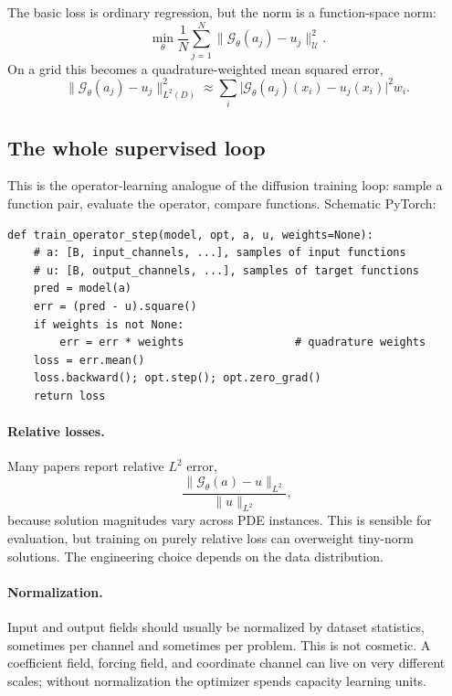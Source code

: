 \documentclass[10pt,a4paper]{article}
\newcommand{\G}{\mathcal{G}}
\newcommand{\U}{\mathcal{U}}
\begin{document}
The basic loss is ordinary regression, but the norm is a function-space norm:
\begin{equation}
  \min_\theta
  \frac1N \sum_{j=1}^N
  \big\| \G_\theta(a_j) - u_j \big\|_{\U}^2.
\label{eq:operator-loss}
\end{equation}
On a grid this becomes a quadrature-weighted mean squared error,
\begin{equation}
  \big\| \G_\theta(a_j) - u_j \big\|_{L^2(D)}^2
  \approx
  \sum_i
  \big|\G_\theta(a_j)(x_i)-u_j(x_i)\big|^2 w_i.
\label{eq:grid-loss}
\end{equation}

\subsection{The whole supervised loop}

This is the operator-learning analogue of the diffusion training loop:
sample a function pair, evaluate the operator, compare functions. Schematic
PyTorch:
\begin{lstlisting}
def train_operator_step(model, opt, a, u, weights=None):
    # a: [B, input_channels, ...], samples of input functions
    # u: [B, output_channels, ...], samples of target functions
    pred = model(a)
    err = (pred - u).square()
    if weights is not None:
        err = err * weights                 # quadrature weights
    loss = err.mean()
    loss.backward(); opt.step(); opt.zero_grad()
    return loss
\end{lstlisting}

\paragraph{Relative losses.}
Many papers report relative $L^2$ error,
\[
  \frac{\|\G_\theta(a)-u\|_{L^2}}{\|u\|_{L^2}},
\]
because solution magnitudes vary across PDE instances. This is sensible for
evaluation, but training on purely relative loss can overweight tiny-norm
solutions. The engineering choice depends on the data distribution.

\paragraph{Normalization.}
Input and output fields should usually be normalized by dataset statistics,
sometimes per channel and sometimes per problem. This is not cosmetic. A
coefficient field, forcing field, and coordinate channel can live on very
different scales; without normalization the optimizer spends capacity
learning units.
\end{document}
